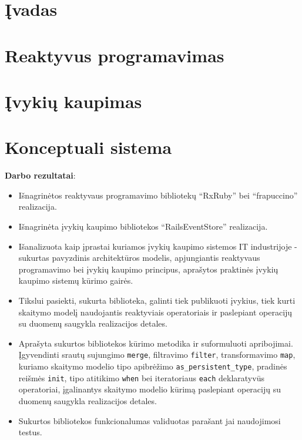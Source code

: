 \documentclass{VUMIFPSmagistrinis}
\begin{document}

\tableofcontents

\section{Įvadas}


\section{Reaktyvus programavimas}


\section{Įvykių kaupimas}


\section{Konceptuali sistema}



\textbf{Darbo rezultatai}:

\begin{itemize}
  \item Išnagrinėtos reaktyvaus programavimo bibliotekų ``RxRuby'' bei ``frapuccino'' realizacija.
  \item Išnagrinėta įvykių kaupimo bibliotekos ``RailsEventStore'' realizacija.
  \item Išanalizuota kaip įprastai kuriamos įvykių kaupimo sistemos IT industrijoje - sukurtas pavyzdinis architektūros modelis, apjungiantis reaktyvaus programavimo bei įvykių kaupimo principus, aprašytos praktinės įvykių kaupimo sistemų kūrimo gairės.
  \item Tikslui pasiekti, sukurta biblioteka, galinti tiek publikuoti įvykius, tiek kurti skaitymo modelį naudojantis reaktyviais operatoriais ir paslepiant operacijų su duomenų saugykla realizacijos detales.
  \item Aprašyta sukurtos bibliotekos kūrimo metodika ir suformuluoti apribojimai. Įgyvendinti srautų sujungimo \lstinline|merge|, filtravimo \lstinline|filter|, transformavimo \lstinline|map|, kuriamo skaitymo modelio tipo apibrėžimo \lstinline|as_persistent_type|, pradinės reišmės \lstinline|init|, tipo atitikimo \lstinline|when| bei iteratoriaus \lstinline|each| deklaratyvūs operatoriai, įgalinantys skaitymo modelio kūrimą paslepiant operacijų su duomenų saugykla realizacijos detales.
  \item Sukurtos bibliotekos funkcionalumas validuotas parašant jai naudojimosi testus.
\end{itemize}
\end{document}
